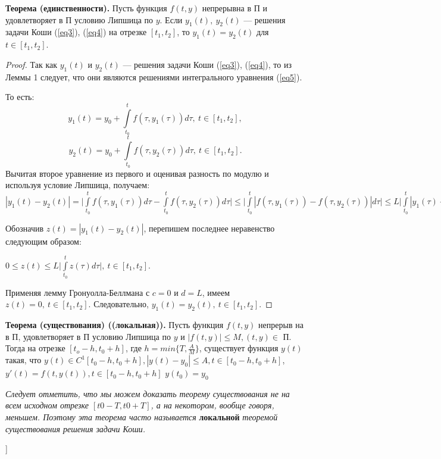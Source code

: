 \textbf{Теорема (единственности).} Пусть функция $f(t,y)$ непрерывна в П и удовлетворяет в П условию Липшица по $y$.
Если $y_1(t),~y_2(t)$ --- решения задачи Коши (\ref{eq3}), (\ref{eq4}) на отрезке $[t_1, t_2]$, то $y_1(t) = y_2(t)$ для $t \in [t_1, t_2]$.

\begin{proof} Так как $y_1(t)$ и $y_2(t)$ --- решения задачи Коши (\ref{eq3}), (\ref{eq4}), то из Леммы 1 следует, что они являются решениями интегрального уравнения (\ref{eq5}).

То есть:
$$y_1(t) = y_0 + \int\limits_{t_0}^{t}f(\tau, y_1(\tau))d\tau,~t\in[t_1,t_2],$$
$$y_2(t) = y_0 + \int\limits_{t_0}^{t}f(\tau, y_2(\tau))d\tau,~t\in[t_1,t_2].$$
Вычитая второе уравнение из первого и оценивая разность по модулю и используя условие Липшица, получаем:
$|y_1(t) - y_2(t)| = \Big| \int\limits_{t_0}^{t}f(\tau, y_1(\tau))d\tau - \int\limits_{t_0}^{t}f(\tau, y_2(\tau))d\tau \Big| \leq \Big| \int\limits_{t_0}^{t}|f(\tau, y_1(\tau)) - f(\tau, y_2(\tau))|d\tau \Big| \leq L\Big| \int\limits_{t_0}^{t}|y_1(\tau) - y_2(\tau)|d\tau \Big|$

Обозначив $z(t) = |y_1(t) - y_2(t)|$, перепишем последнее неравенство следующим образом:

$0 \leqslant z(t) \leqslant L\Big|\int\limits_{t_0}^{t}z(\tau)d\tau \Big|,~t \in [t_1,t_2].$

Применяя лемму Гронуолла-Беллмана с $c = 0$ и $d = L$, имеем
$z(t) = 0,~t \in [t_1, t_2]$. Следовательно, $y_1(t) = y_2(t),~t \in [t_1, t_2].$
\end{proof} 

\textbf{Теорема (существования) ((локальная)).}
Пусть функция $f(t,y)$ непрерыв на в П, удовлетворяет в П условию Липшица по $y$ и $|f(t,y)| \leq M, (t,y) \in$ П. Тогда на отрезке $[t_o - h, t_0 + h]$, где $h = min\{T, \frac{A}{M}\}$, существует функция $y(t)$ такая, что $y(t) \in C^1 [t_0-h, t_0 + h], |y(t) - y_0| \leq A, t \in [t_0 - h, t_0 + h]$,\newline
$y'(t) = f(t,y(t)), t \in [t_0 - h, t_0 + h]$
$y(t_0) = y_0$\newline

\textit{Следует отметить, что мы можем доказать теорему существования не на всем исходном отрезке $[t0 - T , t0 + T ]$, а на некотором, вообще говоря, меньшем. Поэтому эта теорема часто называется} \textbf{локальной} \textit{теоремой существования решения задачи Коши.}



\bigbreak
[\cite[page 25-30]{denisov}]
